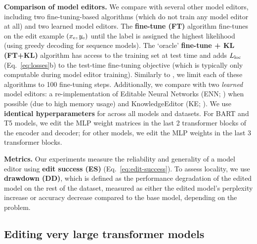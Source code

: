 \documentclass{article}
\begin{document}


\textbf{Comparison of model editors.}
We compare {\name} with several other model editors, including two fine-tuning-based algorithms (which do not train any model editor at all) and two learned model editors. The \textbf{fine-tune (FT)} algorithm fine-tunes on the edit example $(x_\text{e},y_\text{e})$ until the label is assigned the highest likelihood (using greedy decoding for sequence models). The `oracle' \textbf{fine-tune + KL (FT+KL)} algorithm has access to the training set at test time and adds $L_\text{loc}$ (Eq.~\ref{eq:losses}b) to the test-time fine-tuning objective (which is typically only computable during model editor training). Similarly to \citet{Cao2021EditingFK}, we limit each of these algorithms to 100 fine-tuning steps. Additionally, we compare with two \textit{learned} model editors: a re-implementation of Editable Neural Networks (ENN; \citealp{Sinitsin2020Editable}) when possible (due to high memory usage) and KnowledgeEditor (KE; \citealp{Cao2021EditingFK}). We use \textbf{identical hyperparameters} for {\name} across all models and datasets. For BART and T5 models, we edit the MLP weight matrices in the last 2 transformer blocks of the encoder and decoder; for other models, we edit the MLP weights in the last 3 transformer blocks. 

\textbf{Metrics.} Our experiments measure the reliability and generality of a model editor using \textbf{edit success (ES)} (Eq.~\ref{eq:edit-success}). To assess locality, we use \textbf{drawdown (DD)}, which is defined as the performance degradation of the edited model on the rest of the dataset, measured as either the edited model's perplexity increase or accuracy decrease compared to the base model, depending on the problem.

\subsection{Editing very large transformer models}
\label{sec:large-models}



\end{document}
